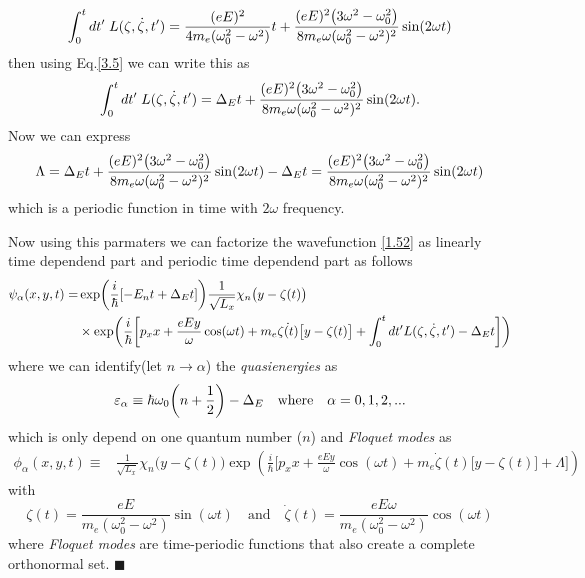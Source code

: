 \begin{equation} \label{3.10}
    \int_0^t dt' \; L(\zeta,\dot{\zeta},t')  =
    \frac{(eE)^2}{4m_e(\omega_0^2 - \omega^2)}t
    +
    \frac{(eE)^2\qty(3\omega^2 - \omega_0^2)}{8m_e\omega(\omega_0^2 - \omega^2)^2}
    \sin(2\omega t)
\end{equation}
then using Eq.\eqref{3.5} we can write this as
\begin{equation} \label{3.11}
    \int_0^t dt' \; L(\zeta,\dot{\zeta},t')  =
    \Delta_E t
    +
    \frac{(eE)^2\qty(3\omega^2 - \omega_0^2)}{8m_e\omega(\omega_0^2 - \omega^2)^2}
    \sin(2\omega t).
\end{equation}
Now we can express
\begin{equation} \label{3.12}
    \Lambda  =
    \Delta_E t
    +
    \frac{(eE)^2\qty(3\omega^2 - \omega_0^2)}{8m_e\omega(\omega_0^2 - \omega^2)^2}
    \sin(2\omega t) - \Delta_E t
    =
    \frac{(eE)^2\qty(3\omega^2 - \omega_0^2)}{8m_e\omega(\omega_0^2 - \omega^2)^2} \sin(2\omega t)
\end{equation}
which is a periodic function in time with $2\omega$ frequency.

\noindent
Now using this parmaters we can factorize the wavefunction \eqref{1.52} as linearly time dependend part and periodic time dependend part as follows
\begin{equation} \label{3.13}
  \begin{aligned}
    \psi_{\alpha}(x,y,t)  = &
    \exp(\frac{i}{\hbar}\qty[-E_nt + \Delta_E t ])
    \frac{1}{\sqrt{L_x}} \chi_n\big(y - \zeta(t)\big)
    \\
    & \times
    \exp(
     \frac{i}{\hbar}\bigg[
     p_x x +
     \frac{eEy}{\omega}\cos(\omega t)+
     m_e\dot{\zeta(t)}\big[y-\zeta(t)\big]
     + \int_0^{t}dt'L(\zeta,\dot{\zeta},t') - \Delta_E t  \bigg])
  \end{aligned}
\end{equation}
where we can identify(let $n \rightarrow \alpha$) the \textit{quasienergies} as
\begin{equation} \label{3.14}
  \varepsilon_{\alpha} \equiv
  \hbar \omega_0\qty(n + \frac{1}{2}) - \Delta_E \quad \text{where} \quad
  \alpha = 0,1,2, ...
\end{equation}
which is only depend on one quantum number ($n$) and \textit{Floquet modes} as
\begin{equation} \label{3.15}
  \begin{aligned}
    \phi_{\alpha}(x,y,t) \equiv &
    \frac{1}{\sqrt{L_x}} \chi_{n}\big(y - \zeta(t)\big)
    \exp(
     \frac{i}{\hbar}\bigg[
     p_x x +
     \frac{eEy}{\omega}\cos(\omega t)+
     m_e\dot{\zeta}(t)\big[y-\zeta(t)\big]
     + \Lambda \bigg])
  \end{aligned}
\end{equation}
with
\begin{equation} \label{3.16}
  \zeta(t) = \frac{eE}{m_e(\omega_0^2 - \omega^2)}\sin(\omega t) \quad \text{and} \quad
  \dot{\zeta}(t) = \frac{eE\omega}{m_e(\omega_0^2 - \omega^2)}\cos(\omega t)
\end{equation}
where  \textit{Floquet modes} are time-periodic functions that also create a complete orthonormal set.
\hfill$\blacksquare$

